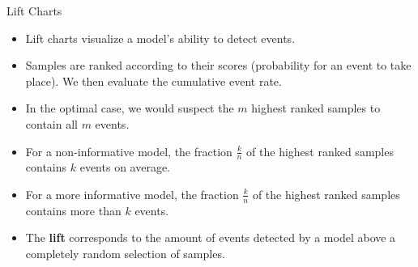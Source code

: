 \documentclass[11pt,compress,t,notes=noshow, xcolor=table]{beamer}
\date{}
\begin{document}


\begin{frame}{Lift Charts}

\begin{itemize}
\setlength\itemsep{1em}
    \item Lift charts visualize a model's ability to detect events.
    \item Samples are ranked according to their scores (probability for an event to take place). We then evaluate the cumulative event rate.
    \item In the optimal case, we would suspect the $m$ highest ranked samples to contain all $m$ events.
    \item For a non-informative model, the fraction $\frac{k}{n}$ of the highest ranked samples contains $k$ events on average.
    \item For a more informative model, the fraction $\frac{k}{n}$ of the highest ranked samples contains more than $k$ events.
    \item The \textbf{lift} corresponds to the amount of events detected by a model above a completely random selection of samples.
\end{itemize}
\end{frame}
\end{document}
